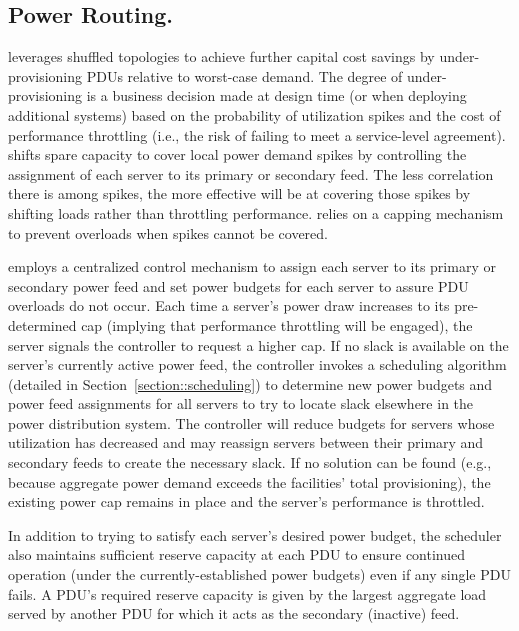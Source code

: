 \subsection{Power Routing.}

\PowerRouting leverages shuffled topologies to achieve further capital cost savings by under-provisioning PDUs relative to worst-case demand.   The degree of under-provisioning is a business decision made at design time (or when deploying additional systems) based on the probability of utilization spikes and the cost of performance throttling (i.e., the risk of failing to meet a service-level agreement).  \PowerRouting shifts spare capacity to cover local power demand spikes by controlling the assignment of each server to its primary or secondary feed.  The less correlation there is among spikes, the more effective \PowerRouting will be at covering those spikes by shifting loads rather than throttling performance.  \PowerRouting relies on a capping mechanism to prevent overloads when spikes cannot be covered.

\PowerRouting employs a centralized control mechanism to assign each server to its primary or secondary power feed and set power budgets for each server to assure PDU overloads do not occur.  Each time a server's power draw increases to its pre-determined cap (implying that performance throttling will be engaged), the server signals the \PowerRouting controller to request a higher cap.  If no slack is available on the server's currently active power feed, the controller invokes a scheduling algorithm (detailed in Section~\ref{section::scheduling}) to determine new power budgets and power feed assignments for all servers to try to locate slack elsewhere in the power distribution system.  The controller will reduce budgets for servers whose utilization has decreased and may reassign servers between their primary and secondary feeds to create the necessary slack.  If no solution can be found (e.g., because aggregate power demand exceeds the facilities' total provisioning), the existing power cap remains in place and the server's performance is throttled.  

In addition to trying to satisfy each server's desired power budget, the \PowerRouting scheduler also maintains sufficient reserve capacity at each PDU to ensure continued operation (under the currently-established power budgets) even if any single PDU fails.  A PDU's required reserve capacity is given by the largest aggregate load served by another PDU for which it acts as the secondary (inactive) feed.

